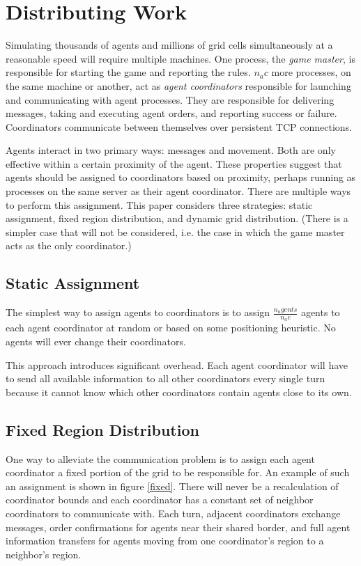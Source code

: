 \section{Distributing Work}

Simulating thousands of agents and millions of grid cells simultaneously at a reasonable speed will require multiple machines. One process, the \emph{game master}, is responsible for starting the game and reporting the rules. $n_ac$ more processes, on the same machine or another, act as \emph{agent coordinators} responsible for launching and communicating with agent processes. They are responsible for delivering messages, taking and executing agent orders, and reporting success or failure. Coordinators communicate between themselves over persistent TCP connections.

Agents interact in two primary ways: messages and movement. Both are only effective within a certain proximity of the agent. These properties suggest that agents should be assigned to coordinators based on proximity, perhaps running as processes on the same server as their agent coordinator. There are multiple ways to perform this assignment. This paper considers three strategies: static assignment, fixed region distribution, and dynamic grid distribution. (There is a simpler case that will not be considered, i.e. the case in which the game master acts as the only coordinator.)

\subsection{Static Assignment}

The simplest way to assign agents to coordinators is to assign $\frac{n_agents}{n_ac}$ agents to each agent coordinator at random or based on some positioning heuristic. No agents will ever change their coordinators.

This approach introduces significant overhead. Each agent coordinator will have to send all available information to all other coordinators every single turn because it cannot know which other coordinators contain agents close to its own.

\subsection{Fixed Region Distribution}

One way to alleviate the communication problem is to assign each agent coordinator a fixed portion of the grid to be responsible for. An example of such an assignment is shown in figure \ref{fixed}. There will never be a recalculation of coordinator bounds and each coordinator has a constant set of neighbor coordinators to communicate with. Each turn, adjacent coordinators exchange messages, order confirmations for agents near their shared border, and full agent information transfers for agents moving from one coordinator's region to a neighbor's region.

